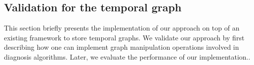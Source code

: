 \subsection{Validation for the temporal graph}

This section briefly presents the implementation of our approach on top of an existing framework to store temporal graphs.
We validate our approach by first describing how one can implement graph manipulation operations involved in diagnosis algorithms. Later, we evaluate the performance of our implementation..

